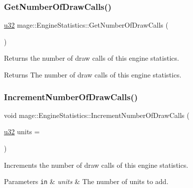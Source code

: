 \subsubsection{\texorpdfstring{Get\+Number\+Of\+Draw\+Calls()}{GetNumberOfDrawCalls()}}
{\footnotesize\ttfamily \hyperlink{namespacemage_af2b398bf98eb10351f49cad73fe2cc73}{u32} mage\+::\+Engine\+Statistics\+::\+Get\+Number\+Of\+Draw\+Calls (\begin{DoxyParamCaption}{ }\end{DoxyParamCaption})\hspace{0.3cm}{\ttfamily [noexcept]}}

Returns the number of draw calls of this engine statistics.

\begin{DoxyReturn}{Returns}
The number of draw calls of this engine statistics. 
\end{DoxyReturn}
\hypertarget{structmage_1_1_engine_statistics_a26e45d8996cc018f3632f3c2c0fcff7c}{}\label{structmage_1_1_engine_statistics_a26e45d8996cc018f3632f3c2c0fcff7c} 
\subsubsection{\texorpdfstring{Increment\+Number\+Of\+Draw\+Calls()}{IncrementNumberOfDrawCalls()}}
{\footnotesize\ttfamily void mage\+::\+Engine\+Statistics\+::\+Increment\+Number\+Of\+Draw\+Calls (\begin{DoxyParamCaption}\item[{\hyperlink{namespacemage_af2b398bf98eb10351f49cad73fe2cc73}{u32}}]{units = {} }\end{DoxyParamCaption})\hspace{0.3cm}{\ttfamily [noexcept]}}

Increments the number of draw calls of this engine statistics.


\begin{DoxyParams}[1]{Parameters}
\mbox{\tt in}  & {\em units} & The number of units to add. \\
\hline
\end{DoxyParams}
\hypertarget{structmage_1_1_engine_statistics_a6c5e8b9a5806e67f6f93a3c558293249}{}\label{structmage_1_1_engine_statistics_a6c5e8b9a5806e67f6f93a3c558293249} 
